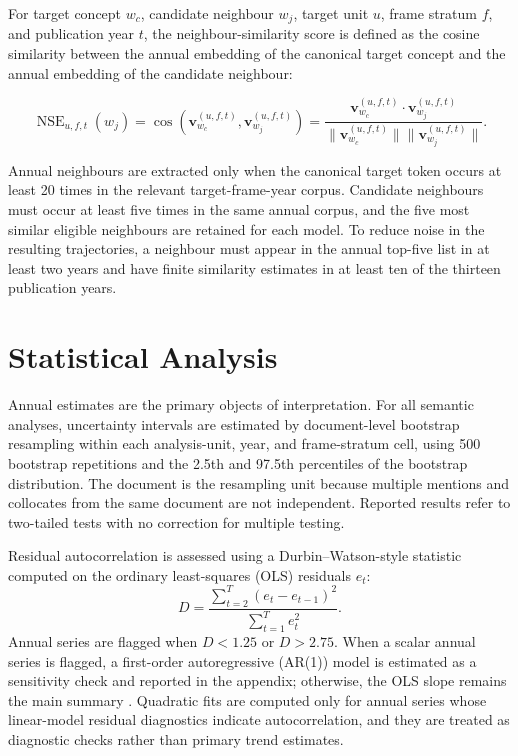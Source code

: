 For target concept \(w_c\), candidate neighbour \(w_j\), target unit \(u\), frame stratum \(f\), and publication year \(t\), the neighbour-similarity score is defined as the cosine similarity between the annual embedding of the canonical target concept and the annual embedding of the candidate neighbour:

\begin{equation}
\operatorname{NSE}_{u,f,t}(w_j)
=
\cos\!\left(
\mathbf{v}^{(u,f,t)}_{w_c},
\mathbf{v}^{(u,f,t)}_{w_j}
\right)
=
\frac{
\mathbf{v}^{(u,f,t)}_{w_c} \cdot \mathbf{v}^{(u,f,t)}_{w_j}
}{
\lVert \mathbf{v}^{(u,f,t)}_{w_c} \rVert
\lVert \mathbf{v}^{(u,f,t)}_{w_j} \rVert
}.
\end{equation}

\noindent Annual neighbours are extracted only when the canonical target token occurs at least 20 times in the relevant target-frame-year corpus. Candidate neighbours must occur at least five times in the same annual corpus, and the five most similar eligible neighbours are retained for each model. To reduce noise in the resulting trajectories, a neighbour must appear in the annual top-five list in at least two years and have finite similarity estimates in at least ten of the thirteen publication years.

\section{Statistical Analysis}
\label{sec:methods-statistical-analysis}

Annual estimates are the primary objects of interpretation. For all semantic analyses, uncertainty intervals are estimated by document-level bootstrap resampling within each analysis-unit, year, and frame-stratum cell, using 500 bootstrap repetitions and the 2.5th and 97.5th percentiles of the bootstrap distribution. The document is the resampling unit because multiple mentions and collocates from the same document are not independent. Reported results refer to two-tailed tests with no correction for multiple testing.

Residual autocorrelation is assessed using a Durbin--Watson-style statistic computed on the ordinary least-squares (OLS) residuals \(e_t\):
\begin{equation}
D=\frac{\sum_{t=2}^{T}(e_t-e_{t-1})^2}{\sum_{t=1}^{T}e_t^2}.
\end{equation}
\noindent Annual series are flagged when \(D<1.25\) or \(D>2.75\). When a scalar annual series is flagged, a first-order autoregressive (AR(1)) model is estimated as a sensitivity check and reported in the appendix; otherwise, the OLS slope remains the main summary \citep{chatterjeeRegressionAnalysisExample2012}. Quadratic fits are computed only for annual series whose linear-model residual diagnostics indicate autocorrelation, and they are treated as diagnostic checks rather than primary trend estimates. 

